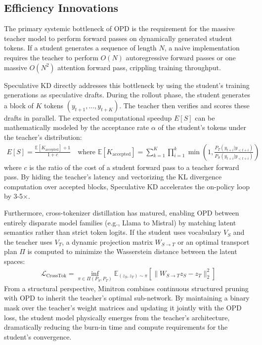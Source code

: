 \documentclass{article} %
\begin{document}
\subsection{Efficiency Innovations}
The primary systemic bottleneck of OPD is the requirement for the massive teacher model to perform forward passes on dynamically generated student tokens. If a student generates a sequence of length $N$, a naive implementation requires the teacher to perform $O(N)$ autoregressive forward passes or one massive $O(N^2)$ attention forward pass, crippling training throughput. 

Speculative KD \citep{2410.11325, 2510.24021} directly addresses this bottleneck by using the student's training generations as speculative drafts. During the rollout phase, the student generates a block of $K$ tokens $(y_{t+1}, \dots, y_{t+K})$. The teacher then verifies and scores these drafts in parallel. The expected computational speedup $E[S]$ can be mathematically modeled by the acceptance rate $\alpha$ of the student's tokens under the teacher's distribution:
\begin{align}
E[S] = \frac{\mathbb{E}[K_{\text{accepted}}] + 1}{1 + c} \quad \text{where } \mathbb{E}[K_{\text{accepted}}] = \sum_{k=1}^K \prod_{i=1}^k \min \left(1, \frac{P_T(y_{t+i} | y_{<t+i})}{P_S(y_{t+i} | y_{<t+i})} \right)
\end{align}
where $c$ is the ratio of the cost of a student forward pass to a teacher forward pass. By hiding the teacher's latency and vectorizing the KL divergence computation over accepted blocks, Speculative KD accelerates the on-policy loop by 3-5$\times$.

Furthermore, cross-tokenizer distillation \citep{2402.12030, 2310.13332} has matured, enabling OPD between entirely disparate model families (e.g., Llama to Mistral) by matching latent semantics rather than strict token logits. If the student uses vocabulary $V_S$ and the teacher uses $V_T$, a dynamic projection matrix $W_{S \to T}$ or an optimal transport plan $\Pi$ is computed to minimize the Wasserstein distance between the latent spaces:
\begin{align}
\mathcal{L}_{\text{CrossTok}} = \inf_{\pi \in \Pi(P_S, P_T)} \mathbb{E}_{(z_S, z_T) \sim \pi} \left[ \parallel W_{S \to T} z_S - z_T \parallel_2^2 \right]
\end{align}
From a structural perspective, Minitron \citep{2311.09829} combines continuous structured pruning with OPD to inherit the teacher's optimal sub-network. By maintaining a binary mask over the teacher's weight matrices and updating it jointly with the OPD loss, the student model physically emerges from the teacher's architecture, dramatically reducing the burn-in time and compute requirements for the student's convergence.
\end{document}
